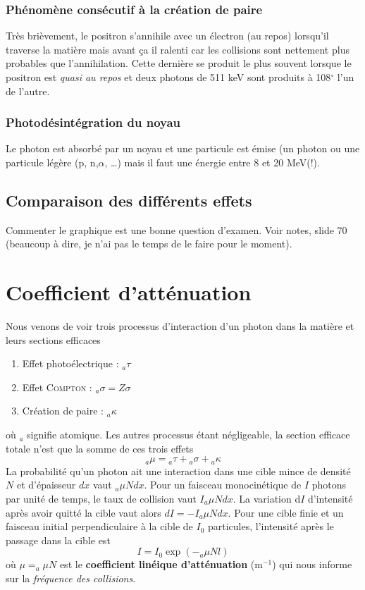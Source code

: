 \subsubsection{Phénomène consécutif à la création de paire}
Très brièvement, le positron s'annihile avec un électron (au repos) lorsqu'il traverse la matière mais 
avant ça il ralenti car les collisions sont nettement plus probables que l'annihilation. Cette
dernière se produit le plus souvent lorsque le positron est \textit{quasi au repos} et deux 
photons de 511 keV sont produits à 108$^\circ$ l'un de l'autre.

\subsubsection{Photodésintégration du noyau}
Le photon est absorbé par un noyau et une particule est émise (un photon ou une particule légère (p,
n,$\alpha$, \dots) mais il faut une énergie entre 8 et 20 MeV(!).

\subsection{Comparaison des différents effets}
Commenter le graphique est une bonne question d'examen. Voir notes, slide 70 (beaucoup à dire, je 
n'ai pas le temps de le faire pour le moment).


\section{Coefficient d'atténuation}
Nous venons de voir trois processus d'interaction d'un photon dans la matière et leurs sections
efficaces
\begin{enumerate}
\item Effet photoélectrique : $_a\tau$
\item Effet \textsc{Compton} : $_a\sigma = Z\sigma$
\item Création de paire : $_a\kappa$
\end{enumerate}
où $_a$ signifie atomique. Les autres processus étant négligeable, la section efficace totale
n'est que la somme de ces trois effets
\begin{equation}
{}_a\mu={}_a\tau+{}_a\sigma+{}_a\kappa
\end{equation}
La probabilité qu'un photon ait une interaction dans une cible mince de densité $N$ et d'épaisseur
$dx$ vaut $_a\mu Ndx$. Pour un faisceau monocinétique de $I$ photons par unité de temps, le taux 
de collision vaut $I_a\mu Ndx$. La variation d$I$ d'intensité après avoir quitté la cible vaut 
alors $dI = -I_a\mu Ndx$. Pour une cible finie et un faisceau initial perpendiculaire à la cible
de $I_0$ particules, l'intensité après le passage dans la cible est
\begin{equation}
I=I_0\exp{(-_a\mu Nl)}
\end{equation}
où $\mu = _a\mu N$ est le \textbf{coefficient linéique d'atténuation} (m$^{-1}$) qui nous 
informe sur la \textit{fréquence des collisions}.

